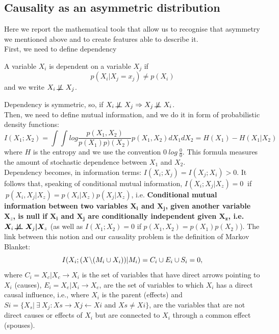 \subsection{Causality as an asymmetric distribution}
Here we report the mathematical tools that allow us to recognise that asymmetry we mentioned above and to create features able to describe it.\\

First, we need to define dependency
\begin{definition}[Dependency]
    A variable $X_i$ is dependent on a variable $X_j$ if $$p(X_i|X_j = x_j) \neq p(X_i)$$ and we write $X_i \not\!\perp\!\!\!\perp X_j$.
\end{definition}
Dependency is symmetric, so, if $X_i \dep X_j \Rightarrow X_j \dep X_i$.\\

Then, we need to define mutual information, and we do it in form of probabilistic density functions:
\begin{equation} \label{eq1}
    I(X_1; X_2) = \int \int log\frac{p(X_1, X_2)}{p(X_1)p)(X_2)}p(X_1, X_2)dX_1dX_2 = H(X_1) - H(X_1|X_2)
\end{equation}
where $H$ is the entropy and we use the convention $0 \ log \ \frac{0}{0}$. This formula measures the amount of stochastic dependence between $X_1$ and $X_2$.\\ 

Dependency becomes, in information terms: $I(X_i; X_j) = I(X_j; X_i) > 0$. It follows that, speaking of conditional mutual information, $I(X_i;X_j|X_z) = 0 \ $ if $ \ p(X_i,X_j|X_z) = p(X_i|X_z)p(X_j|X_z)$, i.e. \textbf{Conditional mutual information between two variables $\bm{X_i}$ and $\bm{X_j}$, given another variable $\bm X_z$, is null if $\bm{X_i}$ and $\bm{X_j}$ are conditionally independent given $\bm{X_z}$, i.e. $\bm X_i \bm{\not\!\perp\!\!\!\perp} \bm X_j \bm| \bm X_z$} (as well as ${I(X_1; X_2) = 0}$ if ${p(X_1, X_2) = p(X_1)p(X_2)}$). The link between this notion and our causality problem is the definition of Markov Blanket:$$I(X_i;(X \symbol{92} (M_i \cup X_i))|M_i) = C_i \cup E_i \cup S_i = 0,$$ where $C_i = {X_c|X_c \rightarrow X_i}$ is the set of variables that have direct arrows pointing to $X_i$ (causes), $E_i = {X_e|X_i \rightarrow X_e}$, are the set of variables to which $X_i$ has a direct causal influence, i.e., where $X_i$ is the parent (effects) and $Si = \{X_s| \ \exists \ X_j : Xs \rightarrow Xj \leftarrow Xi$ and $Xs \neq Xi\}$, are the variables that are not direct causes or effects of $X_i$ but are connected to $X_i$ through a common effect (spouses).\\

